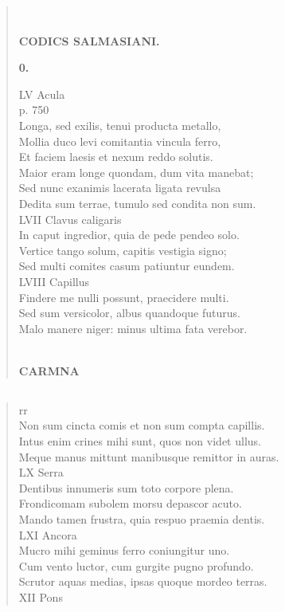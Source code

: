 \documentclass[11pt, a4paper]{report}
\begin{document}
\begin{verse}
        ﻿\pagebreak 
    \begin{center} \textbf{CODICS SALMASIANI.} \end{center}\begin{center} \textbf{0.} \end{center}LV Acula \\ p. 750 \\ Longa, sed exilis, tenui producta metallo, \\ Mollia duco levi comitantia vincula ferro, \\ Et faciem laesis et nexum reddo solutis. \\ Maior eram longe quondam, dum vita manebat; \\ Sed nunc exanimis lacerata ligata revulsa \\ Dedita sum terrae, tumulo sed condita non sum. \\ LVII Clavus caligaris \\ In caput ingredior, quia de pede pendeo solo. \\ Vertice tango solum, capitis vestigia signo; \\ Sed multi comites casum patiuntur eundem. \\ LVIII Capillus \\ Findere me nulli possunt, praecidere multi. \\ Sed sum versicolor, albus quandoque futurus. \\ Malo manere niger: minus ultima fata verebor. \\ 
        ﻿\pagebreak 
     \marginpar{[236]} \begin{center} \textbf{CARMNA} \end{center}
      \end{verse}
  
            \subsection*{}
      \begin{verse}
      rr \\ Non sum cincta comis et non sum compta capillis. \\ Intus enim crines mihi sunt, quos non videt ullus. \\ Meque manus mittunt manibusque remittor in auras. \\ LX Serra \\ Dentibus innumeris sum toto corpore plena. \\ Frondicomam subolem morsu depascor acuto. \\ Mando tamen frustra, quia respuo praemia dentis. \\ LXI Ancora \\ Mucro mihi geminus ferro coniungitur uno. \\ Cum vento luctor, cum gurgite pugno profundo. \\ Scrutor aquas medias, ipsas quoque mordeo terras. \\ XII Pons \\ 
      \end{verse}
  
\end{document}
